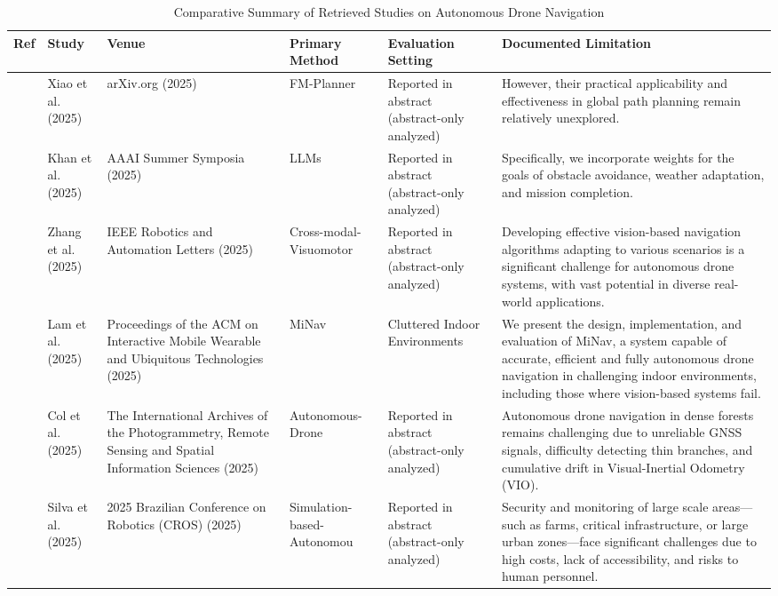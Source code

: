 \documentclass[10pt,twocolumn,letterpaper]{article}
\begin{document}
\begin{table}[t]
\centering
\caption{Comparative Summary of Retrieved Studies on Autonomous Drone Navigation}
\label{tab:comparative_studies}
\scriptsize
\begin{tabularx}{\textwidth}{l l l X X X}
\toprule
\textbf{Ref} & \textbf{Study} & \textbf{Venue} & \textbf{Primary Method} & \textbf{Evaluation Setting} & \textbf{Documented Limitation} \\
\midrule
\cite{ref1} & Xiao et al. (2025) & arXiv.org (2025) & FM-Planner & Reported in abstract (abstract-only analyzed) & However, their practical applicability and effectiveness in global path planning remain relatively unexplored. \\
\cite{ref2} & Khan et al. (2025) & AAAI Summer Symposia (2025) & LLMs & Reported in abstract (abstract-only analyzed) & Specifically, we incorporate weights for the goals of obstacle avoidance, weather adaptation, and mission completion. \\
\cite{ref3} & Zhang et al. (2025) & IEEE Robotics and Automation Letters (2025) & Cross-modal-Visuomotor & Reported in abstract (abstract-only analyzed) & Developing effective vision-based navigation algorithms adapting to various scenarios is a significant challenge for autonomous drone systems, with vast potential in diverse real-world applications. \\
\cite{ref4} & Lam et al. (2025) & Proceedings of the ACM on Interactive Mobile Wearable and Ubiquitous Technologies (2025) & MiNav & Cluttered Indoor Environments & We present the design, implementation, and evaluation of MiNav, a system capable of accurate, efficient and fully autonomous drone navigation in challenging indoor environments, including those where vision-based systems fail. \\
\cite{ref5} & Col et al. (2025) & The International Archives of the Photogrammetry, Remote Sensing and Spatial Information Sciences (2025) & Autonomous-Drone & Reported in abstract (abstract-only analyzed) & Autonomous drone navigation in dense forests remains challenging due to unreliable GNSS signals, difficulty detecting thin branches, and cumulative drift in Visual-Inertial Odometry (VIO). \\
\cite{ref6} & Silva et al. (2025) & 2025 Brazilian Conference on Robotics (CROS) (2025) & Simulation-based-Autonomou & Reported in abstract (abstract-only analyzed) & Security and monitoring of large scale areas—such as farms, critical infrastructure, or large urban zones—face significant challenges due to high costs, lack of accessibility, and risks to human personnel. \\

\end{tabularx}
\end{table}
\end{document}
